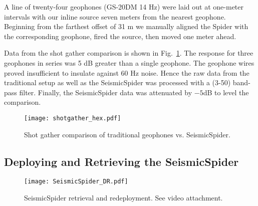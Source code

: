 A line of twenty-four geophones (GS-20DM 14 Hz) were laid out at one-meter intervals with our inline source seven meters from the nearest geophone. Beginning from the farthest offset of 31 m we manually aligned the Spider with the corresponding geophone, fired the source, then moved one meter ahead. 

Data from the shot gather comparison is shown in Fig.~\ref{fig:shotgatherHexpod}.
The response for three geophones in series was 5 dB greater than a single geophone. The geophone wires proved insufficient to insulate against 60 Hz noise. Hence the raw data from the traditional setup as well as the SeismicSpider was processed with a (3-50) band-pass filter. Finally, the SeismicSpider data was attenuated by $-5$dB to level the comparison.    

\begin{figure} \centering
  \texttt{[image: shotgather\_hex.pdf]}
 \caption{Shot gather comparison of traditional geophones vs. SeismicSpider. 
 \label{fig:shotgatherHexpod}}
\end{figure}



\subsection{Deploying and Retrieving the SeismicSpider}

\begin{figure} \centering
  \texttt{[image: SeismicSpider\_DR.pdf]}
 \caption{SeismicSpider retrieval and redeployment. See video attachment. 
 \label{fig:SeismicSpiderDR}}
\end{figure}


